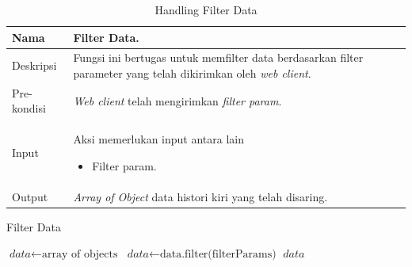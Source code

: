 \begin{table}[H]
    \centering
       \caption{Handling Filter Data}
    \begin{tabular}{|p{3cm}|p{10cm}|}
    \hline
        Nama & Filter Data.\\
    \hline
    \hline
        Deskripsi & Fungsi ini bertugas untuk memfilter data berdasarkan filter parameter yang telah dikirimkan oleh \textit{web client}.
        \\
    \hline
        Pre-kondisi &\textit{Web client} telah mengirimkan \textit{filter param}.\\
    \hline
        Input & 
        Aksi memerlukan input antara lain 
        \begin{itemize}
            \item Filter param.
        \end{itemize}
       \\
       \hline
        Output & 
        \textit{Array of Object} data histori kiri yang telah disaring.
       \\
    \hline
    \end{tabular}
\end{table}


\begin{algorithm}[htbp]
\caption{Filter Data}
\begin{algorithmic}[1]
\State $\textit{data} \gets \text{array of objects}$
\State $\textit{data} \gets \text{data.filter(filterParams)}$
\State \Return $\textit{data}$
\EndIf
\EndProcedure
\end{algorithmic}
\end{algorithm}
